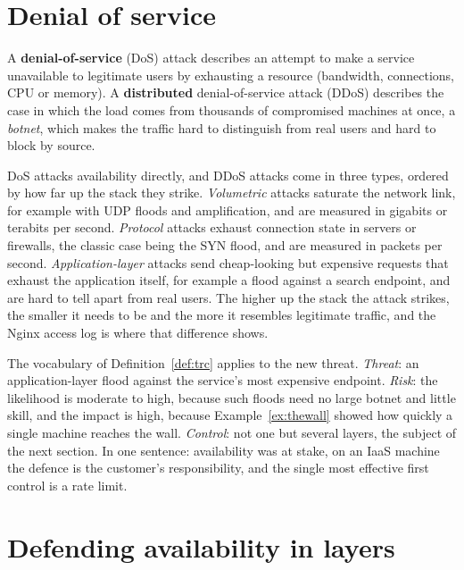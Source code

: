 \section{Denial of service}

\begin{definition}\label{def:ddos}
A \textbf{denial-of-service} (DoS) attack describes an attempt to make a
service unavailable to legitimate users by exhausting a resource (bandwidth,
connections, CPU or memory). A \textbf{distributed} denial-of-service attack
(DDoS) describes the case in which the load comes from thousands of
compromised machines at once, a \emph{botnet}, which makes the traffic hard to
distinguish from real users and hard to block by source.
\end{definition}

DoS attacks availability directly, and DDoS attacks come in three types,
ordered by how far up the stack they strike. \emph{Volumetric} attacks
saturate the network link, for example with UDP floods and amplification,
and are measured in gigabits or terabits per second. \emph{Protocol} attacks
exhaust connection state in servers or firewalls, the classic case being the
SYN flood, and are measured in packets per second. \emph{Application-layer}
attacks send cheap-looking but expensive requests that exhaust the
application itself, for example a flood against a search endpoint, and are
hard to tell apart from real users. The higher up the stack the attack
strikes, the smaller it needs to be and the more it resembles legitimate
traffic, and the Nginx access log is where that difference shows.

\begin{example}\label{ex:ddos-trc}
The vocabulary of Definition~\ref{def:trc} applies to the new threat.
\emph{Threat}: an application-layer flood against the service's most expensive
endpoint. \emph{Risk}: the likelihood is moderate to high, because such floods
need no large botnet and little skill, and the impact is high, because
Example~\ref{ex:thewall} showed how quickly a single machine reaches the wall.
\emph{Control}: not one but several layers, the subject of the next section.
In one sentence: availability was at stake, on an IaaS machine the defence
is the customer's responsibility, and the single most effective first
control is a rate limit.
\end{example}

\section{Defending availability in layers}

